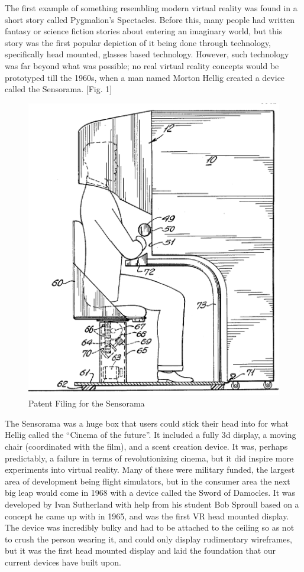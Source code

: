 \documentclass[a4paper,10pt]{article}
\begin{document}
	The first example of something resembling modern virtual reality was found in a short story called Pygmalion's Spectacles.  Before this, many people had written fantasy or science fiction stories about entering an imaginary world, but this story was the first popular depiction of it being done through technology, specifically head mounted, glasses based technology.  However, such technology was far beyond what was possible; no real virtual reality concepts would be prototyped till the 1960s, when a man named Morton Hellig created a device called the Sensorama. [Fig. 1]  
	\begin{figure}[H]
		\includegraphics[scale=0.4]{senso.png}
		\caption{Patent Filing for the Sensorama}
		\label{fig:sensorama}
	\end{figure}
	The Sensorama  was a huge box that users could stick their head into for what Hellig called the “Cinema of the future”.  It included a fully 3d display, a moving chair (coordinated with the film), and a scent creation device.  It was, perhaps predictably, a failure in terms of revolutionizing cinema, but it did inspire more experiments into virtual reality.  Many of these were military funded, the largest area of development being flight simulators, but in the consumer area the next big leap would come in 1968 with a device called the Sword of Damocles.  It was developed by Ivan Sutherland with help from his student Bob Sproull based on a concept he came up with in 1965, and was the first VR head mounted display.  The device was incredibly bulky and had to be attached to the ceiling so as not to crush the person wearing it, and could only display rudimentary wireframes, but it was the first head mounted display and laid the foundation that our current devices have built upon.  
\end{document}
